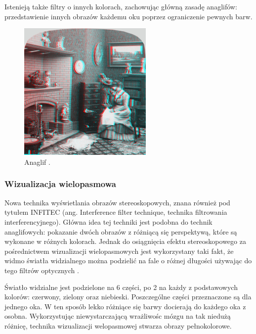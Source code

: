 Istenieją także filtry o innych kolorach, zachowując główną zasadę anaglifów: przedstawienie innych obrazów każdemu oku poprzez ograniczenie pewnych barw.

\begin{figure}[H]
		\centering
 		\includegraphics[width=6.5cm]{anaglif.jpg}
    	\caption{Anaglif \cite{anaglif}.}
 		\label{rys4}
\end{figure}

\subsubsection{Wizualizacja wielopasmowa}
Nowa technika wyświetlania obrazów stereoskopowych, znana również pod tytułem INFITEC (ang. Interference filter technique, technika filtrowania interferencyjnego). Główna idea tej techniki jest podobna do technik anaglifowych: pokazanie dwóch obrazów z różniącą się perspektywą, które są wykonane w różnych kolorach. Jednak do osiągnięcia efektu stereoskopowego za pośrednictwem wizualizacji wielopasmowych jest wykorzystany taki fakt, że widmo światła widzialnego można podzielić na fale o różnej długości używając do tego filtrów optycznych \cite{infitec}.

Światło widzialne jest podzielone na 6 części, po 2 na każdy z podstawowych kolorów: czerwony, zielony oraz niebieski. Poszczególne części przeznaczone są dla jednego oka. W ten sposób lekko różniące się barwy docierają do każdego oka z osobna. Wykorzystując niewystarczającą wrażliwośc mózgu na tak niedużą różnicę, technika wizualizacji welopasmowej stwarza obrazy pełnokolorowe.  

